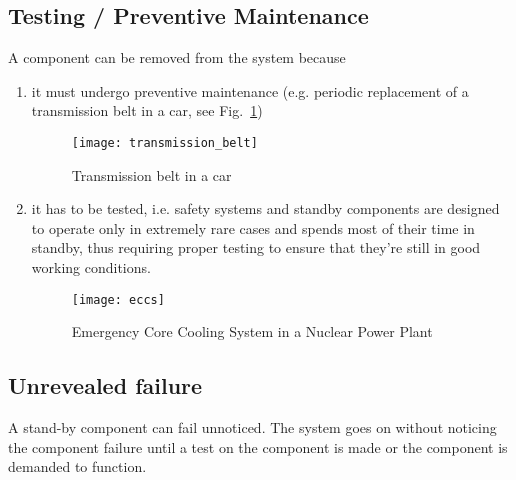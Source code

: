 \subsection{Testing / Preventive Maintenance}
A component can be removed from the system because
\begin{enumerate}[label=\alph*]
    \item it must undergo preventive maintenance (e.g. periodic replacement of a
    transmission belt in a car, see Fig.~\ref{fig:transmission_belt})
    \begin{figure}[H]
        \centering
        \texttt{[image: transmission\_belt]}
        \caption{Transmission belt in a car}
        \label{fig:transmission_belt}
    \end{figure}
    \item it has to be tested, i.e. safety systems and standby components are
    designed to operate only in extremely rare cases and spends most of their
    time in standby, thus requiring proper testing to ensure that they're still
    in good working conditions.
    \begin{figure}[H]
        \centering
        \texttt{[image: eccs]}
        \caption{Emergency Core Cooling System in a Nuclear Power Plant}
    \end{figure}
\end{enumerate}


\subsection{Unrevealed failure}
A stand-by component can fail unnoticed. The system goes on without noticing the
component failure until a test on the component is made or the component is
demanded to function.

